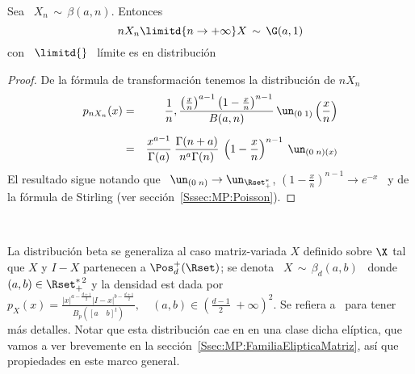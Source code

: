 \begin{lema}
\label{Lem:GamaLimiteBeta}
%
  Sea \ $X_n \, \sim \, \beta(a,n)$. Entonces
  \[
  n X_n \limitd{n \to +\infty} X \, \sim \, \G(a,1)
  \]
  con \ $\displaystyle \limitd{}$ \ l\'imite es en distribuci\'on
\end{lema}
%
\begin{proof}
  De la f\'ormula de transformaci\'on tenemos la distribuci\'on de $n X_n$
  \begin{eqnarray*}
  p_{n X_n}(x) & = & \frac{1}{n} , \frac{\left( \frac{x}{n} \right)^{a-1} \left( 1
  - \frac{x}{n} \right)^{n-1}}{B(a,n)} \, \un_{(0 \; 1)}\left( \frac{x}{n} \right)\\[2mm]
  & = & \frac{x^{a-1}}{\Gamma(a)} \: \frac{\Gamma(n+a)}{n^a \Gamma(n)} \: \left( 1 -
  \frac{x}{n} \right)^{n-1} \: \un_{(0 \; n)(x)}
  \end{eqnarray*}
  El resultado sigue  notando que \ $\un_{(0 \;  n)} \to \un_{\Rset_+^*}$, \quad
  $\left(  1 -  \frac{x}{n} \right)^{n-1}  \to e^{-x}$  \ y  de la  f\'ormula de
  Stirling (ver secci\'on~\ref{Sssec:MP:Poisson}).
\end{proof}

\

La distribuci\'on beta  se generaliza al caso matriz-variada  $X$ definido sobre
$\X$ tal que $X$ y $I-X$ partenecen  a $\Pos_d^+(\Rset)$; se denota \ $X \, \sim
\, \beta_d(a,b)$ \ donde  \ $(a,b) \in \Rset_+^{* \, 2}$ y  la densidad est dada
por   $\displaystyle  p_X(x)   =  \frac{|x|^{a   -  \frac{d+1}{2}}   |I-x|^{b  -
    \frac{d+1}{2}}}{B_p\left([a  \quad  b]^t\right)},  \quad  (a,b)  \in  \left(
  \frac{d-1}{2} \; +\infty \right)^2$. Se refiera a~\cite[Cap.~5]{GupNag99} para
tener m\'as detalles.   Notar que esta distribuci\'on cae en  en una clase dicha
el\'iptica,      que      vamos       a      ver      brevemente      en      la
secci\'on~\ref{Ssec:MP:FamiliaElipticaMatriz},  as\'i  que  propiedades en  este
marco general.
